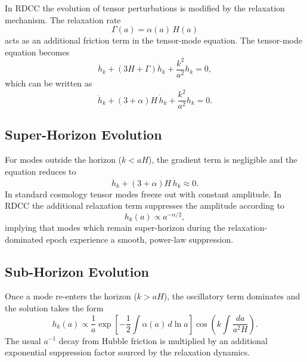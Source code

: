 \documentclass[11pt,a4paper]{article}
\begin{document}
In RDCC the evolution of tensor perturbations is modified by the
relaxation mechanism. The relaxation rate
\begin{equation}
  \Gamma(a)
  =
  \alpha(a)\, H(a)
\end{equation}
acts as an additional friction term in the tensor-mode equation. The
tensor-mode equation becomes
\begin{equation}
  \ddot{h}_{k}
  +
  \left( 3H + \Gamma \right) \dot{h}_{k}
  +
  \frac{k^{2}}{a^{2}} h_{k}
  =
  0,
\end{equation}
which can be written as
\begin{equation}
  \ddot{h}_{k}
  +
  (3 + \alpha) H\, \dot{h}_{k}
  +
  \frac{k^{2}}{a^{2}} h_{k}
  =
  0.
\end{equation}

\subsection{Super-Horizon Evolution}

For modes outside the horizon (\(k < aH\)), the gradient term is negligible
and the equation reduces to
\begin{equation}
  \ddot{h}_{k} + (3 + \alpha) H\, \dot{h}_{k} \approx 0.
\end{equation}
In standard cosmology tensor modes freeze out with constant amplitude. In
RDCC the additional relaxation term suppresses the amplitude according to
\begin{equation}
  h_{k}(a) \propto a^{-\alpha/2},
\end{equation}
implying that modes which remain super-horizon during the
relaxation-dominated epoch experience a smooth, power-law suppression.

\subsection{Sub-Horizon Evolution}

Once a mode re-enters the horizon (\(k > aH\)), the oscillatory term
dominates and the solution takes the form
\begin{equation}
  h_{k}(a)
  \propto
  \frac{1}{a}
  \exp\!
  \left[
    -\frac{1}{2}
    \int \alpha(a)\, d\ln a
  \right]
  \cos\!
  \left(
    k \int \frac{da}{a^{2} H}
  \right).
\end{equation}
The usual \(a^{-1}\) decay from Hubble friction is multiplied by an
additional exponential suppression factor sourced by the relaxation
dynamics.
\end{document}
